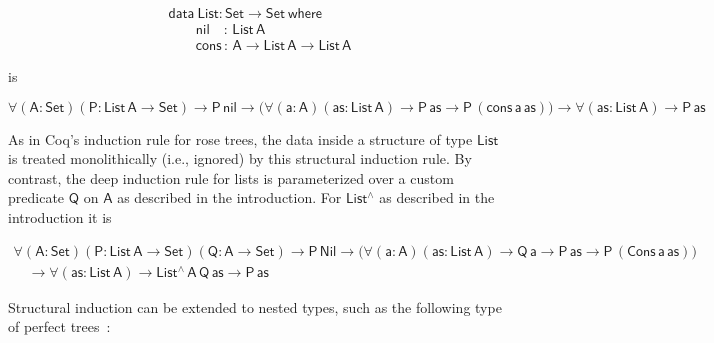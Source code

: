\documentclass[9pt]{entcs}
\begin{document}
\begin{equation*}\label{eq:list}
\begin{array}{l}
\mathsf{data\ List : Set \to Set\ where}\\
\mathsf{\;\;\;\;\;\;\;nil\,\,\,\,\,\, :\, List\,A}\\
\mathsf{\;\;\;\;\;\;\;cons\, :\, A \to List\,A \to List\,A} 
\end{array}
\end{equation*}

\vspace*{-0.1in}

\noindent
is

\vspace*{-0.2in}

\begin{equation*}
\mathsf{
\forall (A : Set) (P : List\,A \to Set)
\to P\,nil
\to \big( \forall (a : A) (as: List\,A)
\to P\,as
\to P\,(cons\,a\,as)\big)
\to \forall (as : List\,A)
\to P\, as
}
\end{equation*}

\vspace*{-0.1in}

\noindent
As in Coq's induction rule for rose trees, the data inside a
structure of type $\mathsf{List}$ is treated monolithically (i.e.,
ignored) by this structural induction rule.
By contrast, the deep induction rule for lists is parameterized over a
custom predicate $\mathsf{Q}$ on $\mathsf{A}$ as described in the
introduction. For $\mathsf{List^\wedge}$ as described in the
introduction it is

\vspace*{-0.2in}

\[\begin{array}{l}
\mathsf{\forall (A : Set) (P : List\, A \to Set) (Q : A \to Set)
\to P\,Nil \to \big( \forall (a : A) (as: List\,A) \to Q\,a \to P\,as
\to P\,(Cons\,a\,as)\big)} \\ 
\quad\mathsf{\to \forall (as : List\,A) \to List^{\wedge}\,A\,Q\,as
  \to P\,as } 
\end{array}\]

\vspace*{-0.1in}

Structural induction can be extended to nested types, such as the
following type of perfect trees~\cite{bm98}:

\pagebreak
\end{document}
